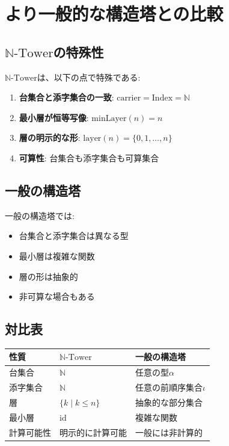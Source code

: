 \documentclass[a4paper,12pt]{article}
\theoremstyle{definition}
\begin{document}
\section{より一般的な構造塔との比較}

\subsection{$\mathbb{N}\text{-Tower}$の特殊性}

$\mathbb{N}\text{-Tower}$は、以下の点で特殊である:

\begin{enumerate}
\item \textbf{台集合と添字集合の一致}: $\text{carrier} = \text{Index} = \mathbb{N}$
\item \textbf{最小層が恒等写像}: $\text{minLayer}(n) = n$
\item \textbf{層の明示的な形}: $\text{layer}(n) = \{0, 1, \ldots, n\}$
\item \textbf{可算性}: 台集合も添字集合も可算集合
\end{enumerate}

\subsection{一般の構造塔}

一般の構造塔では:
\begin{itemize}
\item 台集合と添字集合は異なる型
\item 最小層は複雑な関数
\item 層の形は抽象的
\item 非可算な場合もある
\end{itemize}

\subsection{対比表}

\begin{center}
\begin{tabular}{|l|l|l|}
\hline
性質 & $\mathbb{N}\text{-Tower}$ & 一般の構造塔 \\ \hline
台集合 & $\mathbb{N}$ & 任意の型$\alpha$ \\ \hline
添字集合 & $\mathbb{N}$ & 任意の前順序集合$\iota$ \\ \hline
層 & $\{k \mid k \leq n\}$ & 抽象的な部分集合 \\ \hline
最小層 & $\text{id}$ & 複雑な関数 \\ \hline
計算可能性 & 明示的に計算可能 & 一般には非計算的 \\ \hline
\end{tabular}
\end{center}
\end{document}
